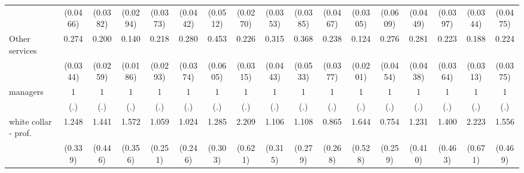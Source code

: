 {\begin{tabular}{l*{16}{c}}
                    &    (0.0466)         &    (0.0382)         &    (0.0294)         &    (0.0373)         &    (0.0442)         &    (0.0512)         &    (0.0270)         &    (0.0353)         &    (0.0385)         &    (0.0467)         &    (0.0305)         &    (0.0609)         &    (0.0449)         &    (0.0397)         &    (0.0344)         &    (0.0475)         \\
[1em]
Other services      &       0.274\sym{***}&       0.200\sym{***}&       0.140\sym{***}&       0.218\sym{***}&       0.280\sym{***}&       0.453\sym{***}&       0.226\sym{***}&       0.315\sym{***}&       0.368\sym{***}&       0.238\sym{***}&       0.124\sym{***}&       0.276\sym{***}&       0.281\sym{***}&       0.223\sym{***}&       0.188\sym{***}&       0.224\sym{***}\\
                    &    (0.0344)         &    (0.0259)         &    (0.0186)         &    (0.0293)         &    (0.0374)         &    (0.0605)         &    (0.0315)         &    (0.0443)         &    (0.0533)         &    (0.0377)         &    (0.0201)         &    (0.0454)         &    (0.0438)         &    (0.0364)         &    (0.0313)         &    (0.0375)         \\
[1em]
managers            &           1         &           1         &           1         &           1         &           1         &           1         &           1         &           1         &           1         &           1         &           1         &           1         &           1         &           1         &           1         &           1         \\
                    &         (.)         &         (.)         &         (.)         &         (.)         &         (.)         &         (.)         &         (.)         &         (.)         &         (.)         &         (.)         &         (.)         &         (.)         &         (.)         &         (.)         &         (.)         &         (.)         \\
[1em]
white collar - prof.&       1.248         &       1.441         &       1.572\sym{*}  &       1.059         &       1.024         &       1.285         &       2.209\sym{**} &       1.106         &       1.108         &       0.865         &       1.644         &       0.754         &       1.231         &       1.400         &       2.223\sym{**} &       1.556         \\
                    &     (0.339)         &     (0.446)         &     (0.356)         &     (0.251)         &     (0.246)         &     (0.303)         &     (0.621)         &     (0.315)         &     (0.279)         &     (0.268)         &     (0.528)         &     (0.259)         &     (0.410)         &     (0.463)         &     (0.671)         &     (0.469)         \\

\end{tabular}}
